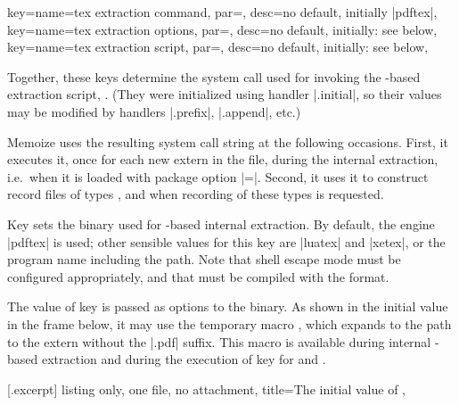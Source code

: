 \documentclass[a4paper,11pt]{article}
\begin{document}
\begin{doc}{
    key={name=tex extraction command, par=,
      desc={no default, initially |pdftex|}},
    key={name=tex extraction options, par=,
      desc={no default, initially: see below}},
    key={name=tex extraction script, par=,
      desc={no default, initially: see below}},
  }
  
  Together, these keys determine the system call used for invoking the
  -based extraction script, .
  (They were initialized using  handler |.initial|, so their
  values may be modified by handlers |.prefix|, |.append|, etc.)

  Memoize uses the resulting system call string at the following occasions.
  First, it executes it, once for each new extern in the \dmmz file, during the
  internal extraction, i.e.\ when it is loaded with package option
  |=|.  Second, it uses it to construct
  record files of types ,  and
   when recording of these types is requested.
  
  Key  sets the  binary used for
  -based internal extraction.  By default, the 
  engine |pdftex| is used; other sensible values for this key are |luatex| and
  |xetex|, or the program name including the path.  Note that shell escape mode
  must be configured appropriately, and that
   must be compiled with the
   format.

  The value of key  is passed as options to the
   binary.  As shown in the initial value in the frame below,
  it may use the temporary macro , which expands to
  the path to the extern without the |.pdf| suffix.  This macro is available
  during internal -based extraction and during the execution of
   key for and .

  [.excerpt]{%
    listing only, one file, no attachment, title={The initial value of
      },
  }


\end{doc}
\end{document}
